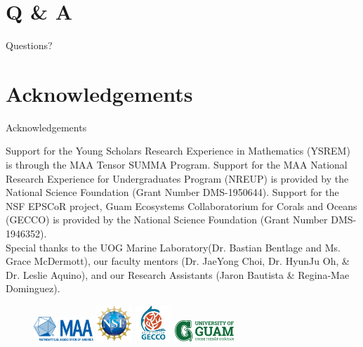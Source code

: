 \documentclass{beamer}
\begin{document}
\section*{Q \& A}
\begin{frame}
    \Huge{Questions?}
\end{frame}

\section*{Acknowledgements}
\begin{frame}{Acknowledgements}
    \begin{center}
        Support for the Young Scholars Research Experience in Mathematics (YSREM)  is through the MAA Tensor SUMMA Program. Support for the MAA National Research Experience for Undergraduates Program (NREUP) is provided by the National Science Foundation (Grant Number DMS-1950644). Support for the NSF EPSCoR project, Guam Ecosystems Collaboratorium for Corals and Oceans (GECCO) is provided by the National Science Foundation (Grant Number DMS-1946352). \\
    \vspace{.2cm}
    \small{Special thanks to the UOG Marine Laboratory(Dr. Bastian Bentlage and Ms. Grace McDermott), our faculty mentors (Dr. JaeYong Choi, Dr. HyunJu Oh, \& Dr. Leslie Aquino), and our Research Assistants (Jaron Bautista \& Regina-Mae Dominguez).}
    
    \begin{figure}
        \includegraphics[width = 0.20\textwidth]{Figures/MAA_logo_PMS286.jpg}
        \label{MAA}
        \includegraphics[width = 0.12\textwidth]{Figures/NSF_4-Color_bitmap_Logo.png}
        \label{NSF}
        \includegraphics[width = 0.12\textwidth]{Figures/epscor.jpeg}
        \label{epscor}
        \includegraphics[width = 0.20\textwidth]{Figures/UOG-horizontal.png}
        \label{uog}
    \end{figure}
    \end{center}
\end{frame}
\end{document}
